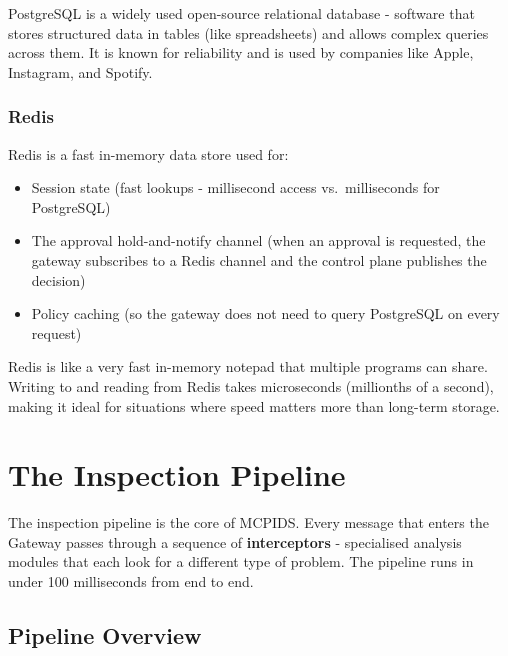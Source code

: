 \documentclass[12pt,a4paper]{report}
\begin{document}
\begin{infobox}
PostgreSQL is a widely used open-source relational database - software that
stores structured data in tables (like spreadsheets) and allows complex
queries across them. It is known for reliability and is used by companies
like Apple, Instagram, and Spotify.
\end{infobox}

\subsection{Redis}

Redis is a fast in-memory data store used for:
\begin{itemize}
  \item Session state (fast lookups - millisecond access vs.\ milliseconds for PostgreSQL)
  \item The approval hold-and-notify channel (when an approval is requested, the
    gateway subscribes to a Redis channel and the control plane publishes the decision)
  \item Policy caching (so the gateway does not need to query PostgreSQL on every request)
\end{itemize}

\begin{infobox}
Redis is like a very fast in-memory notepad that multiple programs can share.
Writing to and reading from Redis takes microseconds (millionths of a second),
making it ideal for situations where speed matters more than long-term storage.
\end{infobox}

\chapter{The Inspection Pipeline}

The inspection pipeline is the core of MCPIDS. Every message that enters the
Gateway passes through a sequence of \textbf{interceptors} - specialised
analysis modules that each look for a different type of problem. The pipeline
runs in under 100 milliseconds from end to end.

\section{Pipeline Overview}
\end{document}
